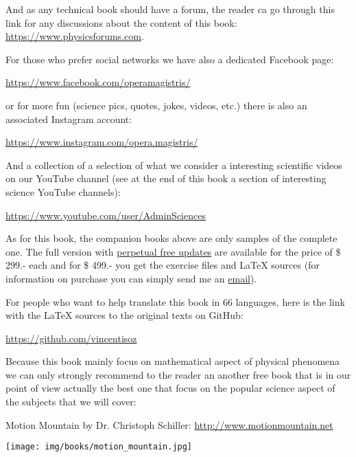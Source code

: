 	And as any technical book should have a forum, the reader ca go through this link for any discussions about the content of this book: \url{https://www.physicsforums.com}.
	
	For those who prefer social networks we have also a dedicated  Facebook page:
	\begin{center}
		\faFacebook{} \href{https://www.facebook.com/operamagistris/}{https://www.facebook.com/operamagistris/}
	\end{center}
	or for more fun (science pics, quotes, jokes, videos, etc.) there is also an associated Instagram account:
	\begin{center}
		\faInstagram{} \href{https://www.instagram.com/opera.magistris/}{https://www.instagram.com/opera.magistris/}
	\end{center}
	And a collection of a selection of what we consider a interesting scientific videos on our YouTube channel (see at the end of this book a section of interesting science YouTube channels):
	\begin{center}
		\faYoutube{} \href{https://www.youtube.com/user/AdminSciences}{https://www.youtube.com/user/AdminSciences}
	\end{center}

	As for this book, the companion books above are only samples of the complete one. The full version with \underline{perpetual free updates} are available for the price of \$ 299.- each and for \$ 499.- you get the exercise files and \LaTeX{} sources (for information on purchase you can simply send me an {\href{mailto:isoz@sciences.ch}{{\color{blue}email}}}).
	
	For people who want to help translate this book in 66 languages, here is the link with the \LaTeX{} sources to the original texts on GitHub:
	\begin{center}
		\faGithubSquare{} \href{https://github.com/vincentisoz}{https://github.com/vincentisoz}
	\end{center}
	Because this book mainly focus on mathematical aspect of physical phenomena we can only strongly recommend to the reader an another free book that is in our point of view actually the best one that focus on the popular science aspect of the subjects that we will cover:
	\begin{center}
	Motion Mountain by Dr. Christoph Schiller: \url{http://www.motionmountain.net}
	\end{center}
	\begin{center}
		\texttt{[image: img/books/motion\_mountain.jpg]}
	\end{center}

